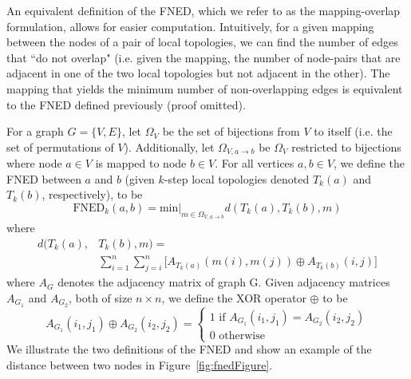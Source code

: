 \documentclass{article}
\begin{document}
An equivalent definition of the FNED, which we refer to as the mapping-overlap formulation, allows for easier computation. Intuitively, for a given mapping between the nodes of a pair of local topologies, we can find the number of edges that ``do not overlap" (i.e. given the mapping, the number of node-pairs that are adjacent in one of the two local topologies but not adjacent in the other). The mapping that yields the minimum number of non-overlapping edges is equivalent to the FNED defined previously (proof omitted).

For a graph $G = \{V,E\}$, let $\Omega_{V}$ be the set of bijections from $V$ to itself (i.e. the set of permutations of $V$). Additionally, let $\Omega_{V, a\rightarrow b}$ be $\Omega_{V}$ restricted to bijections where node $a\in V$ is mapped to node $b\in V$. For all vertices $a,b \in V$, we define the FNED between $a$ and $b$ (given $k$-step local topologies denoted $T_{k}(a)$ and $T_{k}(b)$, respectively), to be
\begin{equation}
\text{FNED}_{k}(a,b) = \text{min} \big|_{m \in \Omega_{V, a\rightarrow b}} d(T_{k}(a), T_{k}(b), m)
\end{equation}
where
\begin{equation}
\begin{split}
d(T_{k}(a), & T_{k}(b), m) = \\ 
& \sum_{i=1}^{n} \sum_{j=i}^{n} \Big[ A_{T_{k}(a)}(m(i),m(j)) \oplus A_{T_{k}(b)}(i,j)  \Big]
\end{split}
\end{equation}
where $A_{G}$ denotes the adjacency matrix of graph G. Given adjacency matrices $A_{G_{1}}$ and $A_{G_{2}}$, both of size $n \times n$, we define the XOR operator $\oplus$ to be
\begin{equation}
A_{G_{1}}(i_{1},j_{1}) \oplus A_{G_{2}}(i_{2},j_{2}) = 
\begin{cases}
1 \text{ if } A_{G_{1}}(i_{1},j_{1}) = A_{G_{2}}(i_{2},j_{2}) \\ 
0 \text{ otherwise}
\end{cases}
\end{equation}
We illustrate the two definitions of the FNED and show an example of the distance between two nodes in Figure~\ref{fig:fnedFigure}.
\end{document}
